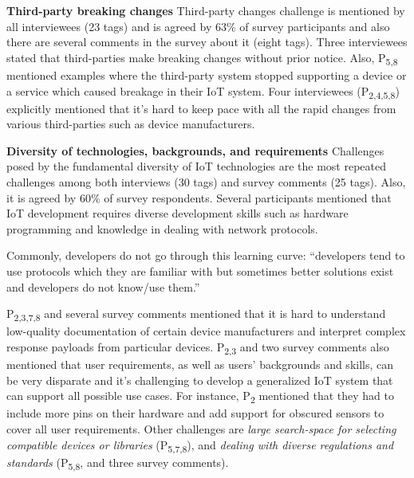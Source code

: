 \textbf{Third-party breaking changes}
Third-party changes challenge is mentioned by all interviewees (23 tags) and is agreed by 63\% of survey participants and also there are several comments in the survey about it (eight tags). Three interviewees stated that third-parties make breaking changes without prior notice. Also, P\textsubscript{5,8} mentioned examples where the third-party system stopped supporting a device or a service which caused breakage in their IoT system. Four interviewees (P\textsubscript{2,4,5,8}) explicitly mentioned that it's hard to keep pace with all the rapid changes from various third-parties such as device manufacturers. 


\textbf{Diversity of technologies, backgrounds, and requirements}
Challenges posed by the fundamental diversity of IoT technologies are the most repeated challenges among both interviews (30 tags) and survey comments (25 tags). Also, it is agreed by 60\% of survey respondents. Several participants mentioned that IoT development requires diverse development skills such as hardware programming and knowledge in dealing with network protocols.

Commonly, developers do not go through this learning curve: \enquote{developers tend to use protocols which they are familiar with but sometimes better solutions exist and developers do not know/use them.} 

P\textsubscript{2,3,7,8} and several survey comments mentioned that it is hard to understand low-quality documentation of certain device manufacturers and interpret complex response payloads from particular devices. P\textsubscript{2,3} and two survey comments also mentioned that user requirements, as well as users' backgrounds and skills, can be very disparate and it's challenging to develop a generalized IoT system that can support all possible use cases. For instance, P\textsubscript{2} mentioned that they had to include more pins on their hardware and add support for obscured sensors to cover all user requirements. Other challenges are \emph{large search-space for selecting compatible devices or libraries} (P\textsubscript{5,7,8}), and \emph{dealing with diverse regulations and standards} (P\textsubscript{5,8}, and three survey comments).


